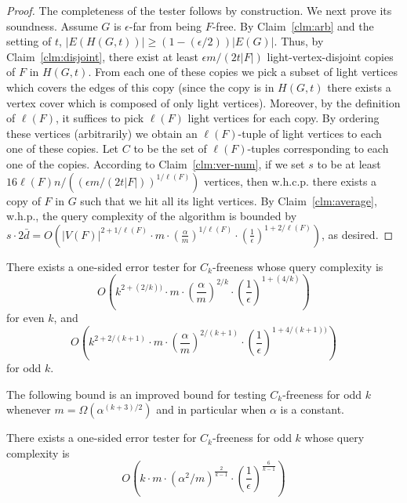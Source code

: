 \begin{proof}
The completeness of the tester follows by construction. 
We next prove its soundness. Assume $G$ is $\epsilon$-far from being $F$-free.
By Claim~\ref{clm:arb} and the setting of $t$, $|E(H(G, t))| \geq (1-(\epsilon/2)) |E(G)|$. 
Thus, by Claim~\ref{clm:disjoint}, there exist at least $\epsilon m/ (2t |F|)$ light-vertex-disjoint copies of $F$ in $H(G, t)$. 
From each one of these copies we pick a subset of light vertices which covers the edges of this copy (since the copy is in $H(G, t)$ there exists a vertex cover which is composed of only light vertices).
Moreover, by the definition of $\ell(F)$, it suffices to pick $\ell(F)$ light vertices for each copy.
By ordering these vertices (arbitrarily) we obtain an $\ell(F)$-tuple of light vertices to each one of these copies.  
Let $C$ to be the set of $\ell(F)$-tuples corresponding to each one of the copies. According to Claim~\ref{clm:ver-num}, if we set $s$ to be at least $16 \ell(F) n / ((\epsilon m/ (2t |F|))^{1/\ell(F)})$ vertices, then w.h.c.p. there exists a copy of $F$ in $G$ such that we hit all its light vertices.
By Claim~\ref{clm:average}, w.h.p., the query complexity of the algorithm is bounded by $s \cdot 2\bar{d} = O\left(|V(F)|^{2+1/\ell(F)} \cdot m \cdot \left(\frac{\alpha}{m }\right)^{1/\ell(F)} \cdot \left(\frac{1}{\epsilon}\right)^{1+2/\ell(F)}\right)$, as desired.
\end{proof}

\begin{corollary}\label{cor:Ck-ub}
There exists a one-sided error tester for $C_k$-freeness whose query complexity is 
$$O\left(k^{2+(2/k))} \cdot m \cdot \left(\frac{\alpha}{m }\right)^{2/k} \cdot \left(\frac{1}{\epsilon}\right)^{1+(4/k)}\right)$$    
for even $k$, and 
$$O\left(k^{2+2/(k+1)} \cdot m \cdot \left(\frac{\alpha}{m }\right)^{2/(k+1)} \cdot \left(\frac{1}{\epsilon}\right)^{1+4/(k+1))}\right)$$    
for odd $k$.
\end{corollary}

The following bound is an improved bound for testing $C_k$-freeness for odd $k$ whenever $m = \Omega(\alpha^{(k+3)/2})$ and in particular when $\alpha$ is a constant.
\begin{theorem}\label{thm:Ck-ub-odd-k}
There exists a one-sided error tester for $C_k$-freeness for odd $k$ whose query complexity is 
$$O\left(k \cdot m \cdot (\alpha^2/m)^{\frac{2}{k-1}} \cdot \left( \frac{1}{\epsilon}\right)^{\frac{6}{k-1}} \right)$$
\end{theorem}

